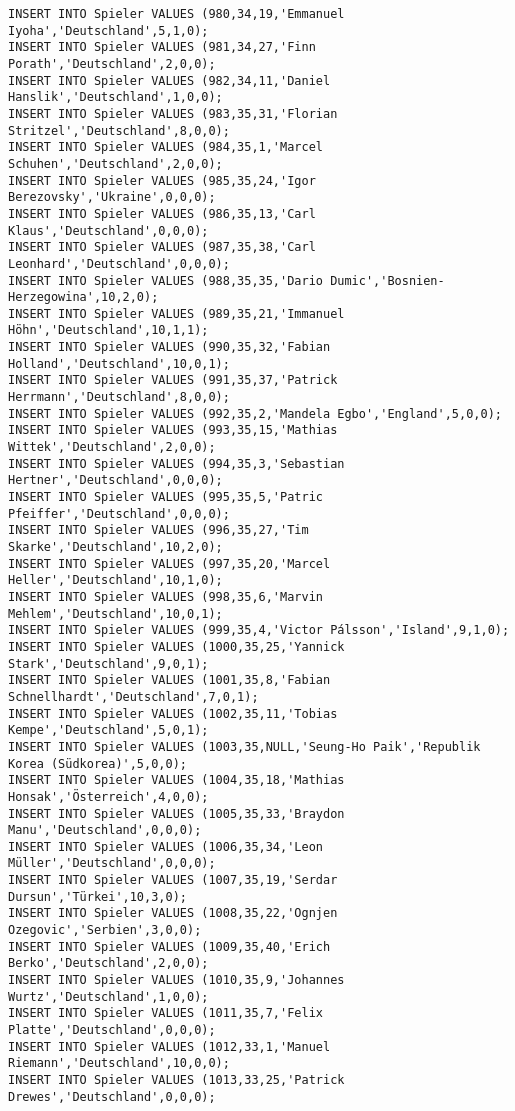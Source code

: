 \documentclass{bschlangaul-aufgabe}
\begin{document}
\begin{verbatim}
INSERT INTO Spieler VALUES (980,34,19,'Emmanuel Iyoha','Deutschland',5,1,0);
INSERT INTO Spieler VALUES (981,34,27,'Finn Porath','Deutschland',2,0,0);
INSERT INTO Spieler VALUES (982,34,11,'Daniel Hanslik','Deutschland',1,0,0);
INSERT INTO Spieler VALUES (983,35,31,'Florian Stritzel','Deutschland',8,0,0);
INSERT INTO Spieler VALUES (984,35,1,'Marcel Schuhen','Deutschland',2,0,0);
INSERT INTO Spieler VALUES (985,35,24,'Igor Berezovsky','Ukraine',0,0,0);
INSERT INTO Spieler VALUES (986,35,13,'Carl Klaus','Deutschland',0,0,0);
INSERT INTO Spieler VALUES (987,35,38,'Carl Leonhard','Deutschland',0,0,0);
INSERT INTO Spieler VALUES (988,35,35,'Dario Dumic','Bosnien-Herzegowina',10,2,0);
INSERT INTO Spieler VALUES (989,35,21,'Immanuel Höhn','Deutschland',10,1,1);
INSERT INTO Spieler VALUES (990,35,32,'Fabian Holland','Deutschland',10,0,1);
INSERT INTO Spieler VALUES (991,35,37,'Patrick Herrmann','Deutschland',8,0,0);
INSERT INTO Spieler VALUES (992,35,2,'Mandela Egbo','England',5,0,0);
INSERT INTO Spieler VALUES (993,35,15,'Mathias Wittek','Deutschland',2,0,0);
INSERT INTO Spieler VALUES (994,35,3,'Sebastian Hertner','Deutschland',0,0,0);
INSERT INTO Spieler VALUES (995,35,5,'Patric Pfeiffer','Deutschland',0,0,0);
INSERT INTO Spieler VALUES (996,35,27,'Tim Skarke','Deutschland',10,2,0);
INSERT INTO Spieler VALUES (997,35,20,'Marcel Heller','Deutschland',10,1,0);
INSERT INTO Spieler VALUES (998,35,6,'Marvin Mehlem','Deutschland',10,0,1);
INSERT INTO Spieler VALUES (999,35,4,'Victor Pálsson','Island',9,1,0);
INSERT INTO Spieler VALUES (1000,35,25,'Yannick Stark','Deutschland',9,0,1);
INSERT INTO Spieler VALUES (1001,35,8,'Fabian Schnellhardt','Deutschland',7,0,1);
INSERT INTO Spieler VALUES (1002,35,11,'Tobias Kempe','Deutschland',5,0,1);
INSERT INTO Spieler VALUES (1003,35,NULL,'Seung-Ho Paik','Republik Korea (Südkorea)',5,0,0);
INSERT INTO Spieler VALUES (1004,35,18,'Mathias Honsak','Österreich',4,0,0);
INSERT INTO Spieler VALUES (1005,35,33,'Braydon Manu','Deutschland',0,0,0);
INSERT INTO Spieler VALUES (1006,35,34,'Leon Müller','Deutschland',0,0,0);
INSERT INTO Spieler VALUES (1007,35,19,'Serdar Dursun','Türkei',10,3,0);
INSERT INTO Spieler VALUES (1008,35,22,'Ognjen Ozegovic','Serbien',3,0,0);
INSERT INTO Spieler VALUES (1009,35,40,'Erich Berko','Deutschland',2,0,0);
INSERT INTO Spieler VALUES (1010,35,9,'Johannes Wurtz','Deutschland',1,0,0);
INSERT INTO Spieler VALUES (1011,35,7,'Felix Platte','Deutschland',0,0,0);
INSERT INTO Spieler VALUES (1012,33,1,'Manuel Riemann','Deutschland',10,0,0);
INSERT INTO Spieler VALUES (1013,33,25,'Patrick Drewes','Deutschland',0,0,0);

\end{verbatim}
\end{document}
